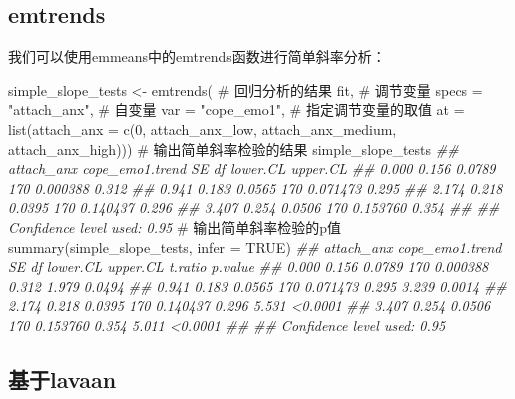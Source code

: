 \documentclass[
  chinese-hans,
  letterpaper,
  DIV=11,
  numbers=noendperiod]{scrartcl}
\newenvironment{Shaded}{\begin{snugshade}}{\end{snugshade}}
\newcommand{\AttributeTok}[1]{\textcolor[rgb]{0.40,0.45,0.13}{#1}}
\newcommand{\CommentTok}[1]{\textcolor[rgb]{0.37,0.37,0.37}{#1}}
\newcommand{\ConstantTok}[1]{\textcolor[rgb]{0.56,0.35,0.01}{#1}}
\newcommand{\DecValTok}[1]{\textcolor[rgb]{0.68,0.00,0.00}{#1}}
\newcommand{\DocumentationTok}[1]{\textcolor[rgb]{0.37,0.37,0.37}{\textit{#1}}}
\newcommand{\FunctionTok}[1]{\textcolor[rgb]{0.28,0.35,0.67}{#1}}
\newcommand{\NormalTok}[1]{\textcolor[rgb]{0.00,0.23,0.31}{#1}}
\newcommand{\OtherTok}[1]{\textcolor[rgb]{0.00,0.23,0.31}{#1}}
\newcommand{\StringTok}[1]{\textcolor[rgb]{0.13,0.47,0.30}{#1}}
\begin{document}
\subsection{emtrends}\label{emtrends}

我们可以使用emmeans中的emtrends函数进行简单斜率分析：

\begin{Shaded}
\begin{Highlighting}[numbers=left,,]
\NormalTok{simple\_slope\_tests }\OtherTok{\textless{}{-}} \FunctionTok{emtrends}\NormalTok{(}
  \CommentTok{\# 回归分析的结果}
\NormalTok{  fit,}
  \CommentTok{\# 调节变量}
  \AttributeTok{specs =} \StringTok{"attach\_anx"}\NormalTok{,}
  \CommentTok{\# 自变量}
  \AttributeTok{var =} \StringTok{"cope\_emo1"}\NormalTok{,}
  \CommentTok{\# 指定调节变量的取值}
  \AttributeTok{at =} \FunctionTok{list}\NormalTok{(}\AttributeTok{attach\_anx =} \FunctionTok{c}\NormalTok{(}\DecValTok{0}\NormalTok{, attach\_anx\_low, attach\_anx\_medium, attach\_anx\_high)))}
\CommentTok{\# 输出简单斜率检验的结果}
\NormalTok{simple\_slope\_tests}
\DocumentationTok{\#\#  attach\_anx cope\_emo1.trend     SE  df lower.CL upper.CL}
\DocumentationTok{\#\#       0.000           0.156 0.0789 170 0.000388    0.312}
\DocumentationTok{\#\#       0.941           0.183 0.0565 170 0.071473    0.295}
\DocumentationTok{\#\#       2.174           0.218 0.0395 170 0.140437    0.296}
\DocumentationTok{\#\#       3.407           0.254 0.0506 170 0.153760    0.354}
\DocumentationTok{\#\# }
\DocumentationTok{\#\# Confidence level used: 0.95}
\CommentTok{\# 输出简单斜率检验的p值}
\FunctionTok{summary}\NormalTok{(simple\_slope\_tests, }\AttributeTok{infer =} \ConstantTok{TRUE}\NormalTok{)}
\DocumentationTok{\#\#  attach\_anx cope\_emo1.trend     SE  df lower.CL upper.CL t.ratio p.value}
\DocumentationTok{\#\#       0.000           0.156 0.0789 170 0.000388    0.312   1.979  0.0494}
\DocumentationTok{\#\#       0.941           0.183 0.0565 170 0.071473    0.295   3.239  0.0014}
\DocumentationTok{\#\#       2.174           0.218 0.0395 170 0.140437    0.296   5.531 \textless{}0.0001}
\DocumentationTok{\#\#       3.407           0.254 0.0506 170 0.153760    0.354   5.011 \textless{}0.0001}
\DocumentationTok{\#\# }
\DocumentationTok{\#\# Confidence level used: 0.95}
\end{Highlighting}
\end{Shaded}

\subsection{基于lavaan}\label{ux57faux4e8elavaan}
\end{document}

